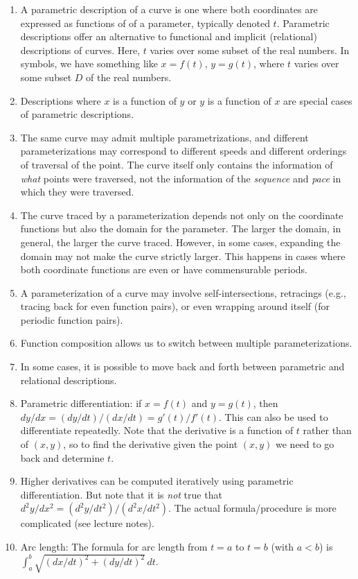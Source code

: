 \documentclass[10pt]{amsart}
\begin{document}
\begin{enumerate}
\item A parametric description of a curve is one where both
  coordinates are expressed as functions of of a parameter, typically
  denoted $t$. Parametric descriptions offer an alternative to
  functional and implicit (relational) descriptions of curves. Here,
  $t$ varies over some subset of the real numbers. In symbols, we have
  something like $x = f(t)$, $y = g(t)$, where $t$ varies over some
  subset $D$ of the real numbers.
\item Descriptions where $x$ is a function of $y$ or $y$ is a function
  of $x$ are special cases of parametric descriptions.
\item The same curve may admit multiple parametrizations, and
  different parameterizations may correspond to different speeds and
  different orderings of traversal of the point. The curve itself only
  contains the information of {\em what} points were traversed, not
  the information of the {\em sequence} and {\em pace} in which they
  were traversed.
\item The curve traced by a parameterization depends not only on the
  coordinate functions but also the domain for the parameter. The
  larger the domain, in general, the larger the curve traced. However,
  in some cases, expanding the domain may not make the curve strictly
  larger. This happens in cases where both coordinate functions are
  even or have commensurable periods.
\item A parameterization of a curve may involve self-intersections,
  retracings (e.g., tracing back for even function pairs), or even
  wrapping around itself (for periodic function pairs).
\item Function composition allows us to switch between multiple
  parameterizations.
\item In some cases, it is possible to move back and forth between
  parametric and relational descriptions.
\item Parametric differentiation: if $x = f(t)$ and $y = g(t)$, then
  $dy/dx = (dy/dt)/(dx/dt) = g'(t)/f'(t)$. This can also be used to
  differentiate repeatedly. Note that the derivative is a function of
  $t$ rather than of $(x,y)$, so to find the derivative given the
  point $(x,y)$ we need to go back and determine $t$.
\item Higher derivatives can be computed iteratively using parametric
  differentiation. But note that it is {\em not} true that $d^2y/dx^2
  = (d^2y/dt^2)/(d^2x/dt^2)$. The actual formula/procedure is more
  complicated (see lecture notes).
\item Arc length: The formula for arc length from $t = a$ to $t = b$
  (with $a < b$) is $\int_a^b \sqrt{(dx/dt)^2 + (dy/dt)^2} \, dt$.
\end{enumerate}
\end{document}
